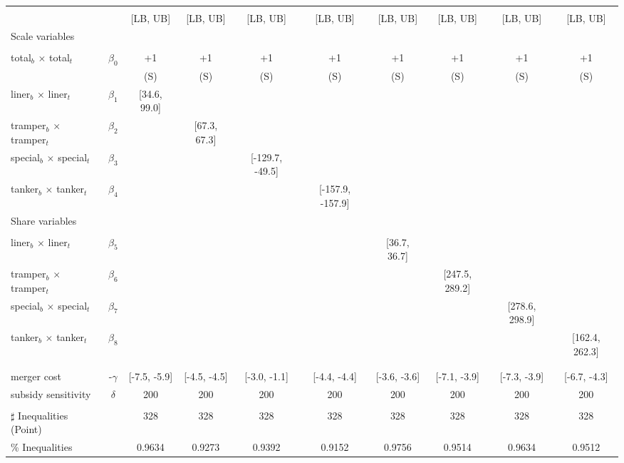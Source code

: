 \begin{tabular}{@{\extracolsep{5pt}}lccccccccc}
\toprule 
 &  &  &  &  &  &  &  &  &  \\
 &  & [LB, UB] & [LB, UB] & [LB, UB] & [LB, UB] & [LB, UB] & [LB, UB] & [LB, UB] & [LB, UB] \\
\midrule 
Scale variables &  &  &  &  &  &  &  \\
 &  &  &  &  &  &  &  &  \\
total$_{b}$ $\times$ total$_{t}$ & $\beta_0$ & +1 & +1 & +1 & +1 & +1 & +1 & +1 & +1 \\
 &  & (S) & (S) & (S) & (S) & (S) & (S) & (S) & (S) \\
liner$_{b}$ $\times$ liner$_{t}$ & $\beta_1$ & [34.6, 99.0] &  &  &  &  &  &  &  \\
tramper$_{b}$ $\times$ tramper$_{t}$ & $\beta_2$ &  & [67.3, 67.3] &  &  &  &  &  &  \\
special$_{b}$ $\times$ special$_{t}$ & $\beta_3$ &  &  & [-129.7, -49.5] &  &  &  &  &  \\
tanker$_{b}$ $\times$ tanker$_{t}$ & $\beta_4$ &  &  &  & [-157.9, -157.9] &  &  &  &  \\
Share variables &  &  &  &  &  &  &  &  &  \\
 &  &  &  &  &  &  &  &  &  \\
liner$_{b}$ $\times$ liner$_{t}$ & $\beta_5$ &  &  &  &  & [36.7, 36.7] &  &  &  \\
tramper$_{b}$ $\times$ tramper$_{t}$ & $\beta_6$ &  &  &  &  &  & [247.5, 289.2] &  &  \\
special$_{b}$ $\times$ special$_{t}$ & $\beta_7$ &  &  &  &  &  &  & [278.6, 298.9] &  \\
tanker$_{b}$ $\times$ tanker$_{t}$ & $\beta_8$ &  &  &  &  &  &  &  & [162.4, 262.3] \\
 &  &  &  &  &  &  &  &  &  \\
 &  &  &  &  &  &  &  &  &  \\
merger cost & -$\gamma$ & [-7.5, -5.9] & [-4.5, -4.5] & [-3.0, -1.1] & [-4.4, -4.4] & [-3.6, -3.6] & [-7.1, -3.9] & [-7.3, -3.9] & [-6.7, -4.3] \\
subsidy sensitivity & $\delta$ & 200 & 200 & 200 & 200 & 200 & 200 & 200 & 200 \\
 &  &  &  &  &  &  &  &  &  \\
\hline 
$\sharp$ Inequalities (Point) &  & 328 & 328 & 328 & 328 & 328 & 328 & 328 & 328 \\
\% Inequalities &  & 0.9634 & 0.9273 & 0.9392 & 0.9152 & 0.9756 & 0.9514 & 0.9634 & 0.9512 \\
\bottomrule 
\end{tabular}
